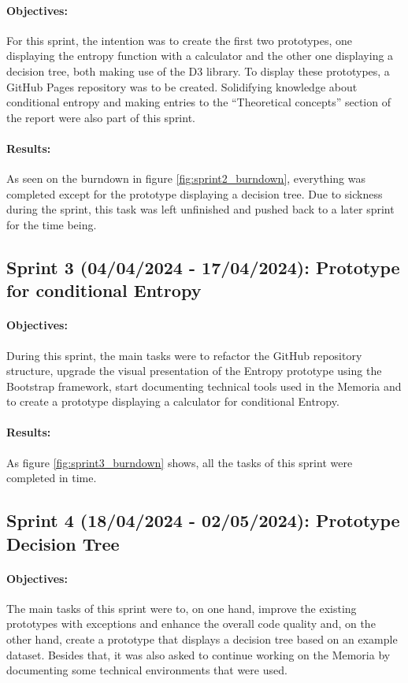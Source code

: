 \paragraph{Objectives:}
For this sprint, the intention was to create the first two prototypes, one displaying the entropy function with a calculator and the other one displaying a decision tree, both making use of the D3 library. To display these prototypes, a GitHub Pages repository was to be created. Solidifying knowledge about conditional entropy and making entries to the ``Theoretical concepts'' section of the report were also part of this sprint. 

\paragraph{Results:}
As seen on the burndown in figure \ref{fig:sprint2_burndown}, everything was completed except for the prototype displaying a decision tree. Due to sickness during the sprint, this task was left unfinished and pushed back to a later sprint for the time being.

\subsection{Sprint 3 (04/04/2024 - 17/04/2024): Prototype for conditional Entropy}
\paragraph{Objectives:}
During this sprint, the main tasks were to refactor the GitHub repository structure, upgrade the visual presentation of the Entropy prototype using the Bootstrap framework, start documenting technical tools used in the Memoria and to create a prototype displaying a calculator for conditional Entropy.

\paragraph{Results:}
As figure \ref{fig:sprint3_burndown} shows, all the tasks of this sprint were completed in time.

\subsection{Sprint 4 (18/04/2024 - 02/05/2024): Prototype Decision Tree} \label{sprint_4}
\paragraph{Objectives:}
The main tasks of this sprint were to, on one hand, improve the existing prototypes with exceptions and enhance the overall code quality and, on the other hand, create a prototype that displays a decision tree based on an example dataset. Besides that, it was also asked to continue working on the Memoria by documenting some technical environments that were used.

